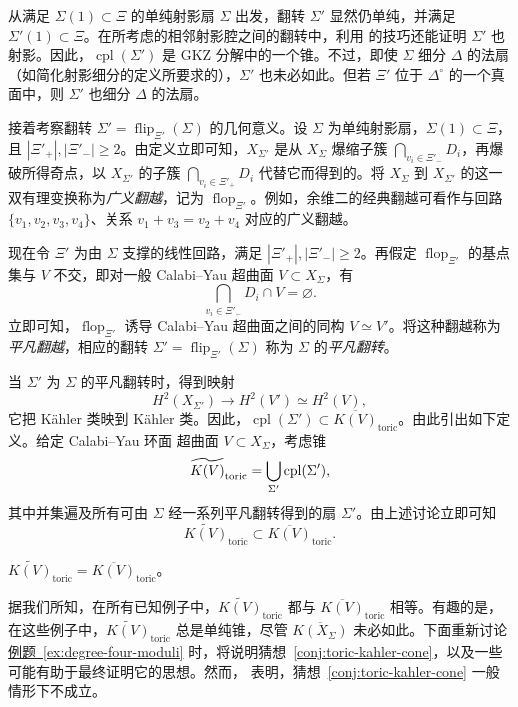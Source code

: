从满足 $\Sigma(1)\subset\Xi$ 的单纯射影扇 $\Sigma$ 出发，翻转 $\Sigma'$ 显然仍单纯，并满足 $\Sigma'(1)\subset\Xi$。在所考虑的相邻射影腔之间的翻转中，利用  的技巧还能证明 $\Sigma'$ 也射影。因此，$\operatorname{cpl}(\Sigma')$ 是 GKZ 分解中的一个锥。不过，即使 $\Sigma$ 细分 $\Delta$ 的法扇（如简化射影细分的定义所要求的），$\Sigma'$ 也未必如此。但若 $\Xi'$ 位于 $\Delta^\circ$ 的一个真面中，则 $\Sigma'$ 也细分 $\Delta$ 的法扇。

接着考察翻转 $\Sigma'=\operatorname{flip}_{\Xi'}(\Sigma)$ 的几何意义。设 $\Sigma$ 为单纯射影扇，$\Sigma(1)\subset\Xi$，且 $|\Xi'_+|,|\Xi'_-|\geq2$。由定义立即可知，$X_{\Sigma'}$ 是从 $X_\Sigma$ 爆缩子簇 $\bigcap_{v_i\in\Xi'_-}D_i$，再爆破所得奇点，以 $X_{\Sigma'}$ 的子簇 $\bigcap_{v_i\in\Xi'_+}D_i$ 代替它而得到的。将 $X_\Sigma$ 到 $X_{\Sigma'}$ 的这一双有理变换称为\emph{广义翻越}，记为 $\operatorname{flop}_{\Xi'}$。例如，余维二的经典翻越可看作与回路 $\{v_1,v_2,v_3,v_4\}$、关系 $v_1+v_3=v_2+v_4$ 对应的广义翻越。

现在令 $\Xi'$ 为由 $\Sigma$ 支撑的线性回路，满足 $|\Xi'_+|,|\Xi'_-|\geq2$。再假定 $\operatorname{flop}_{\Xi'}$ 的基点集与 $V$ 不交，即对一般 Calabi--Yau 超曲面 $V\subset X_\Sigma$，有
\[
\bigcap_{v_i\in\Xi'_-}D_i\cap V=\varnothing.
\]
立即可知，$\operatorname{flop}_{\Xi'}$ 诱导 Calabi--Yau 超曲面之间的同构 $V\simeq V'$。将这种翻越称为\emph{平凡翻越}，相应的翻转 $\Sigma'=\operatorname{flip}_{\Xi'}(\Sigma)$ 称为 $\Sigma$ 的\emph{平凡翻转}。

当 $\Sigma'$ 为 $\Sigma$ 的平凡翻转时，得到映射
\[
H^2(X_{\Sigma'})\longrightarrow H^2(V')\simeq H^2(V),
\]
它把 Kähler 类映到 Kähler 类。因此，$\operatorname{cpl}(\Sigma')\subset\overline{K(V)}_{\mathrm{toric}}$。由此引出如下定义。给定 Calabi--Yau 环面
超曲面 $V\subset X_\Sigma$，考虑锥
\begin{equation}\label{eq:trivial-flip-kahler-union}\index{平凡翻转|hyperpage}
\widetilde{K(V)}_{\mathrm{toric}}=\bigcup_{\Sigma'}\operatorname{cpl}(\Sigma'),
\end{equation}
其中并集遍及所有可由 $\Sigma$ 经一系列平凡翻转得到的扇 $\Sigma'$。由上述讨论立即可知
\[
\widetilde{K(V)}_{\mathrm{toric}}\subset\overline{K(V)}_{\mathrm{toric}}.
\]
\begin{conjecture}\label{conj:toric-kahler-cone}
$\widetilde{K(V)}_{\mathrm{toric}}=\overline{K(V)}_{\mathrm{toric}}$。
\end{conjecture}
据我们所知，在所有已知例子中，$\widetilde{K(V)}_{\mathrm{toric}}$ 都与 $\overline{K(V)}_{\mathrm{toric}}$ 相等。有趣的是，在这些例子中，$\widetilde{K(V)}_{\mathrm{toric}}$ 总是单纯锥，尽管 $\overline{K(X_\Sigma)}$ 未必如此。下面重新讨论\hyperref[ex:degree-four-moduli]{例题~\ref*{ex:degree-four-moduli}} 时，将说明猜想~\ref{conj:toric-kahler-cone}，以及一些可能有助于最终证明它的思想。然而， 表明，猜想~\ref{conj:toric-kahler-cone} 一般情形下不成立。


